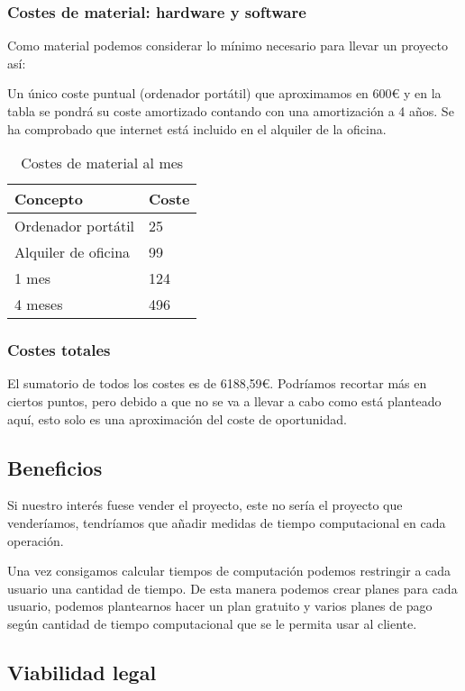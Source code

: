 \subsubsection{Costes de material: hardware y software}

Como material podemos considerar lo mínimo necesario para llevar un proyecto así:

Un único coste puntual (ordenador portátil) que aproximamos en 600€ y en la tabla se pondrá su coste amortizado contando con una amortización a 4 años. Se ha comprobado que internet está incluido en el alquiler de la oficina.
\FloatBarrier
\begin{table}[]
\centering
\begin{tabular}{@{}ll@{}}
\toprule
Concepto & Coste \\ \midrule
Ordenador portátil & 25 \\
Alquiler de oficina & 99 \\
1 mes & 124 \\ \midrule
4 meses  & 496 \\ \bottomrule
\end{tabular}
\caption{Costes de material al mes}
\label{Costes mensualmente}
\end{table}
\FloatBarrier

\subsubsection{Costes totales}
El sumatorio de todos los costes es de 6188,59€. Podríamos recortar más en ciertos puntos, pero debido a que no se va a llevar a cabo como está planteado aquí, esto solo es una aproximación del coste de oportunidad.




\subsection{Beneficios}
Si nuestro interés fuese vender el proyecto, este no sería el proyecto que venderíamos, tendríamos que añadir medidas de tiempo computacional en cada operación.

Una vez consigamos calcular tiempos de computación podemos restringir a cada usuario una cantidad de tiempo. De esta manera podemos crear planes para cada usuario, podemos plantearnos hacer un plan gratuito y varios planes de pago según cantidad de tiempo computacional que se le permita usar al cliente. 


\subsection{Viabilidad legal}

